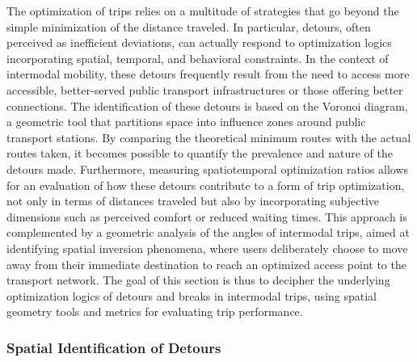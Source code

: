 \begin{refsegment}
The optimization of trips relies on a multitude of strategies that go beyond the simple minimization of the distance traveled. In particular, detours, often perceived as inefficient deviations, can actually respond to optimization logics incorporating spatial, temporal, and behavioral constraints. In the context of intermodal mobility, these detours frequently result from the need to access more accessible, better-served public transport infrastructures or those offering better connections. The identification of these detours is based on the Voronoi diagram, a geometric tool that partitions space into influence zones around public transport stations. By comparing the theoretical minimum routes with the actual routes taken, it becomes possible to quantify the prevalence and nature of the detours made. Furthermore, measuring spatiotemporal optimization ratios allows for an evaluation of how these detours contribute to a form of trip optimization, not only in terms of distances traveled but also by incorporating subjective dimensions such as perceived comfort or reduced waiting times. This approach is complemented by a geometric analysis of the angles of intermodal trips, aimed at identifying spatial inversion phenomena, where users deliberately choose to move away from their immediate destination to reach an optimized access point to the transport network. The goal of this section is thus to decipher the underlying optimization logics of detours and breaks in intermodal trips, using spatial geometry tools and metrics for evaluating trip performance.%

\subsubsection*{Spatial Identification of Detours
    \label{chap5:identification-detours}
    }


\end{refsegment}
